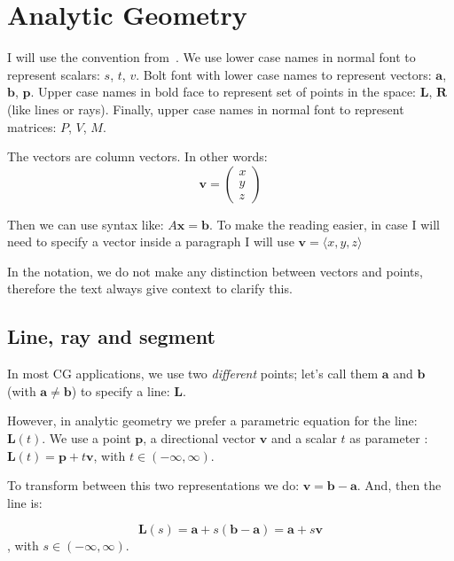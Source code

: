 \section{Analytic Geometry}

I will use the convention from~\cite{Buss2003}.
We use lower case names in normal font to represent scalars: $s$, $t$, $v$.
Bolt font with lower case names to represent vectors: $\mathbf{a}$, $\mathbf{b}$, $\mathbf{p}$.
Upper case names in bold face to represent set of points in the space: $\mathbf{L}$, $\mathbf{R}$ (like lines or rays).
Finally, upper case names in normal font to represent matrices: $P$, $V$, $M$.

The vectors are column vectors. In other words:
$$ \mathbf{v} = \begin{pmatrix}
  x \\ 
  y \\
  z
 \end{pmatrix} $$

Then we can use syntax like: $A \mathbf{x} = \mathbf{b}$.
To make the reading easier, in case I will need to specify a vector inside a paragraph I will use $\mathbf{v} = \langle x, y, z \rangle$

In the notation, we do not make any distinction between vectors and points, therefore the text always give context to clarify this. 

\subsection{Line, ray and segment}

In most CG applications, we use two \emph{different} points; let's call them $\mathbf{a}$ and $\mathbf{b}$ (with $\mathbf{a} \neq \mathbf{b}$) to specify a line: $\mathbf{L}$. 

However, in analytic geometry we prefer a parametric equation for the line: $\mathbf{L}(t)$.
We use a point $\mathbf{p}$, a directional vector $\mathbf{v}$ and a scalar $t$ as parameter : $\mathbf{L}(t) = \mathbf{p} + t \mathbf{v}$, with $t \in (-\infty, \infty)$.

To transform between this two representations we do: $\mathbf{v} = \mathbf{b} -\mathbf{a}$. And, then the line is: 

\begin{equation}
\mathbf{L}(s) = \mathbf{a} + s (\mathbf{b} -\mathbf{a}) = \mathbf{a} + s \mathbf{v} 
\label{eq:line}
\end{equation}
, with $s \in (-\infty, \infty)$. 

